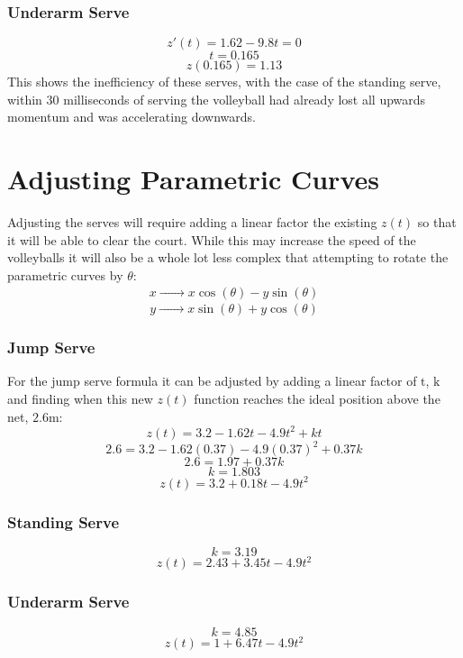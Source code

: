 \documentclass{article}
\begin{document}
													\subsubsection*{Underarm Serve}
													\[z'(t) = 1.62 - 9.8t = 0\]
													\[t = 0.165\]
													\[z(0.165) = 1.13\]
													This shows the inefficiency of these serves, with the case of the standing serve, within 30 milliseconds of serving the volleyball had already lost all upwards momentum and was accelerating downwards.

													\section*{Adjusting Parametric Curves}
													Adjusting the serves will require adding a linear factor the existing \(z(t)\) so that it will be able to clear the court. While this may increase the speed of the volleyballs it will also be a whole lot less complex that attempting to rotate the parametric curves by \(\theta\): 
													\[
														x \xrightarrow{\phantom{---}} x \cos(\theta) - y \sin(\theta)
													\]
													\[
														y \xrightarrow{\phantom{---}} x \sin(\theta) + y \cos(\theta)
													\]
													\subsubsection*{Jump Serve}
													For the jump serve formula it can be adjusted by adding a linear factor of \(\mathrm{t}\), \(\mathrm{k}\) and finding when this new \(z(t)\) function reaches the ideal position above the net, \(2.6\)m:
													\[z(t) = 3.2 - 1.62t - 4.9t^{2} + kt\]
													\[2.6 = 3.2 - 1.62(0.37) - 4.9(0.37)^{2} + 0.37k\]
													\[2.6 = 1.97 + 0.37k\]
													\[k = 1.803\]
													\[z(t) = 3.2 + 0.18t - 4.9t^{2}\]


													\subsubsection*{Standing Serve}
													\[k = 3.19\]
													\[z(t) = 2.43 + 3.45t - 4.9t^{2}\]


													\subsubsection*{Underarm Serve}
													\[k = 4.85\]
													\[z(t) = 1 + 6.47t - 4.9t^{2}\]
\end{document}
